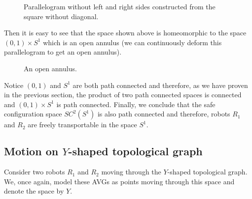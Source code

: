 \documentclass[12pt]{article}
\theoremstyle{definition}
\begin{document}
\begin{figure}[H]
    \centering
    \caption*{Parallelogram without left and right sides constructed from the square without diagonal.}
\end{figure}

Then it is easy to see that the space shown above is homeomorphic to the space
$(0, 1) \times S^1$ which is an open annulus (we can continuously deform this parallelogram
to get an open annulus).

\begin{figure}[H]
    \centering
    \caption*{An open annulus.}
\end{figure}

Notice $(0, 1)$ and $S^1$ are both path connected and therefore,
as we have proven in the previous section, the product of two path connected spaces is
connected and $(0, 1) \times S^1$ is path connected. Finally, we conclude that the safe
configuration space $SC^2(S^1)$ is also path connected and therefore, robots $R_1$ and
$R_2$ are freely transportable in the space $S^1$.


\subsection*{\centering Motion on $Y$-shaped topological graph}
Consider two robots $R_1$ and $R_2$ moving through the $Y$-shaped topological graph.
We, once again, model these AVGs as points moving through this space and denote the space by $Y$.
\end{document}
